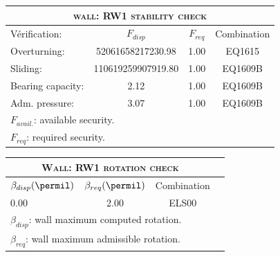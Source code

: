 \begin{center}
\begin{tabular}[H]{|l|c|c|c|}
\hline
\multicolumn{4}{|c|}{\textsc{wall: RW1 stability check}}\\
\hline
Vérification:  & $F_{disp}$ & $F_{req}$ & Combination\\
\hline
Overturning:  & 52061658217230.98 & 1.00 & EQ1615\\
Sliding:  & 110619259907919.80 & 1.00 & EQ1609B\\
Bearing capacity:  & 2.12 & 1.00 & EQ1609B\\
Adm. pressure:  & 3.07 & 1.00 & EQ1609B\\
\hline
\multicolumn{4}{|l|}{$F_{avail.}$: available security.}\\
\multicolumn{4}{|l|}{$F_{req}$: required security.}\\
\hline
\end{tabular}
\end{center}
\begin{center}
\begin{tabular}[H]{|l|c|c|c|}
\hline
\multicolumn{3}{|c|}{\textsc{Wall: RW1 rotation check}}\\
\hline
$\beta_{disp} (\permil)$ & $\beta_{req}(\permil)$ & Combination\\
\hline
0.00 & 2.00 & ELS00\\
\hline
\multicolumn{3}{|l|}{$\beta_{disp}$: wall maximum computed rotation.}\\
\multicolumn{3}{|l|}{$\beta_{req}$: wall maximum admissible rotation.}\\
\hline
\end{tabular}
\end{center}
 \label{tb_RW1}
\tablelasttail{\hline}
